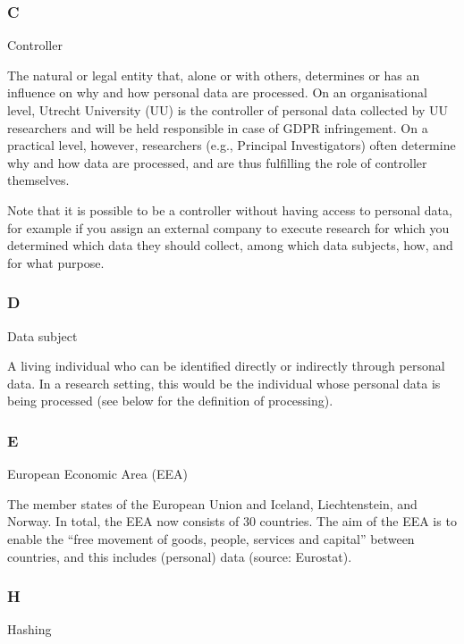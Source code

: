 \documentclass[
]{book}
\begin{document}
\hypertarget{c}{%
\subsubsection{C}\label{c}}

Controller

The natural or legal entity that, alone or with others, determines or has an influence on why and how
personal data are processed. On an organisational level, Utrecht University (UU) is the controller of personal data
collected by UU researchers and will be held responsible in case of GDPR infringement. On a practical level, however,
researchers (e.g., Principal Investigators) often determine why and how data are processed, and are thus fulfilling the
role of controller themselves.

Note that it is possible to be a controller without having access to personal
data, for example if you assign an external company to execute research for
which you determined which data they should collect, among which data subjects,
how, and for what purpose.

\hypertarget{d}{%
\subsubsection{D}\label{d}}

Data subject

A living individual who can be identified directly or indirectly through personal data. In a research setting,
this would be the individual whose personal data is being processed (see below for the definition of processing).

\hypertarget{e}{%
\subsubsection{E}\label{e}}

European Economic Area (EEA)

The member states of the European Union and Iceland, Liechtenstein, and Norway. In total, the EEA now consists of
30 countries. The aim of the EEA is to enable the ``free movement of goods, people, services and capital'' between countries,
and this includes (personal) data (source:
Eurostat).

\hypertarget{h}{%
\subsubsection{H}\label{h}}

Hashing
\end{document}
